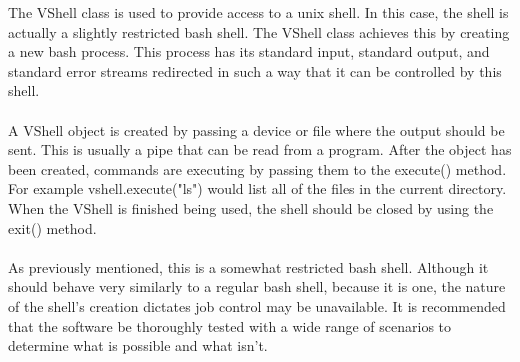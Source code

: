 The VShell class is used to provide access to a unix shell. In this case, the shell is actually a 
slightly restricted bash shell. The VShell class achieves this by creating a new bash process. This
process has its standard input, standard output, and standard error streams redirected in such a 
way that it can be controlled by this shell.\\
\\
A VShell object is created by passing a device or file where the output should be sent. This is usually a
pipe that can be read from a program. After the object has been created, commands are executing by passing
them to the execute() method. For example vshell.execute("ls") would list all of the files in the current
directory. When the VShell is finished being used, the shell should be closed by using the exit() method.\\
\\
As previously mentioned, this is a somewhat restricted bash shell. Although it should behave very similarly to
a regular bash shell, because it is one, the nature of the shell's creation dictates job control may be unavailable.
It is recommended that the software be thoroughly tested with a wide range of scenarios to determine what is 
possible and what isn't.


%

